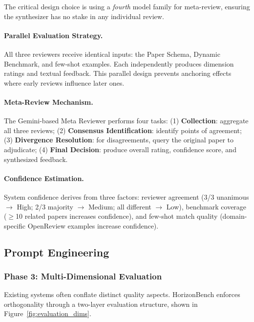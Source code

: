 The critical design choice is using a \textit{fourth} model family for meta-review, ensuring the synthesizer has no stake in any individual review.

\paragraph{Parallel Evaluation Strategy.} All three reviewers receive identical inputs: the Paper Schema, Dynamic Benchmark, and few-shot examples. Each independently produces dimension ratings and textual feedback. This parallel design prevents anchoring effects where early reviews influence later ones.

\paragraph{Meta-Review Mechanism.} The Gemini-based Meta Reviewer performs four tasks: (1) \textbf{Collection}: aggregate all three reviews; (2) \textbf{Consensus Identification}: identify points of agreement; (3) \textbf{Divergence Resolution}: for disagreements, query the original paper to adjudicate; (4) \textbf{Final Decision}: produce overall rating, confidence score, and synthesized feedback.

\paragraph{Confidence Estimation.} System confidence derives from three factors: reviewer agreement (3/3 unanimous $\rightarrow$ High; 2/3 majority $\rightarrow$ Medium; all different $\rightarrow$ Low), benchmark coverage ($\geq$10 related papers increases confidence), and few-shot match quality (domain-specific OpenReview examples increase confidence).

\subsection{Prompt Engineering}

\subsubsection{Phase 3: Multi-Dimensional Evaluation}

Existing systems often conflate distinct quality aspects. HorizonBench enforces orthogonality through a two-layer evaluation structure, shown in Figure~\ref{fig:evaluation_dims}.

